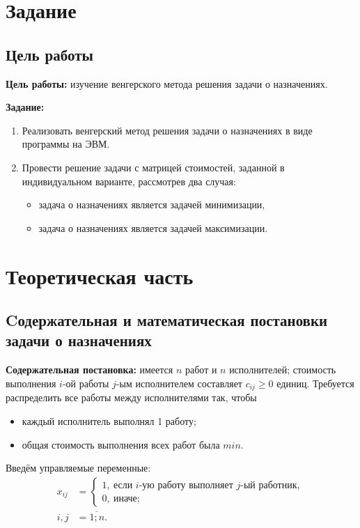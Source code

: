 \documentclass[a4paper,12pt, unknownkeysallowed]{extreport}
\begin{document}


\chapter{Задание}

\section{Цель работы}

\textbf{Цель работы:} изучение венгерского метода решения задачи о назначениях.

\textbf{Задание:}
\begin{enumerate}
	\item Реализовать венгерский метод решения задачи о назначениях в виде программы на ЭВМ.
	\item Провести решение задачи с матрицей стоимостей, заданной в индивидуальном варианте, рассмотрев два случая:
	\begin{itemize}
		\item задача о назначениях является задачей минимизации,
		\item задача о назначениях является задачей максимизации.
	\end{itemize}
\end{enumerate}

\chapter{Теоретическая часть}

\section{Cодержательная и математическая постановки задачи о назначениях}

\textbf{Содержательная постановка:} имеется $n$ работ и $n$ исполнителей; стоимость выполнения $i$-ой работы $j$-ым исполнителем составляет $c_{ij} \geq 0$ единиц. Требуется распределить все работы между исполнителями так, чтобы
\begin{itemize}
	\item каждый исполнитель выполнял 1 работу;
	\item общая стоимость выполнения всех работ была $min$.
\end{itemize}

Введём управляемые переменные:
\begin{align}
	x_{ij} & =
	\begin{cases}
		1, \: \text{если $i$-ую работу выполняет $j$-ый работник}, \\
		0, \: \text{иначе};
	\end{cases} \nonumber \\
	i, j & = \overline{1; n}. 
\end{align}
\end{document}
